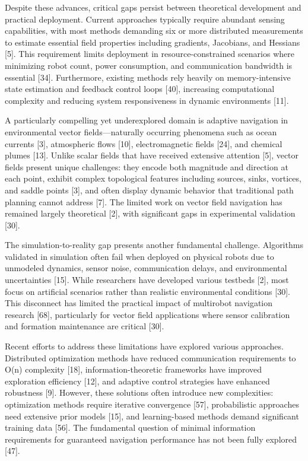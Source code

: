 \documentclass{article}
\begin{document}
Despite these advances, critical gaps persist between theoretical development and practical deployment. Current approaches typically require abundant sensing capabilities, with most methods demanding six or more distributed measurements to estimate essential field properties including gradients, Jacobians, and Hessians [5]. This requirement limits deployment in resource-constrained scenarios where minimizing robot count, power consumption, and communication bandwidth is essential [34]. Furthermore, existing methods rely heavily on memory-intensive state estimation and feedback control loops [40], increasing computational complexity and reducing system responsiveness in dynamic environments [11].

A particularly compelling yet underexplored domain is adaptive navigation in environmental vector fields---naturally occurring phenomena such as ocean currents [3], atmospheric flows [10], electromagnetic fields [24], and chemical plumes [13]. Unlike scalar fields that have received extensive attention [5], vector fields present unique challenges: they encode both magnitude and direction at each point, exhibit complex topological features including sources, sinks, vortices, and saddle points [3], and often display dynamic behavior that traditional path planning cannot address [7]. The limited work on vector field navigation has remained largely theoretical [2], with significant gaps in experimental validation [30].

The simulation-to-reality gap presents another fundamental challenge. Algorithms validated in simulation often fail when deployed on physical robots due to unmodeled dynamics, sensor noise, communication delays, and environmental uncertainties [15]. While researchers have developed various testbeds [2], most focus on artificial scenarios rather than realistic environmental conditions [30]. This disconnect has limited the practical impact of multirobot navigation research [68], particularly for vector field applications where sensor calibration and formation maintenance are critical [30].


Recent efforts to address these limitations have explored various approaches. Distributed optimization methods have reduced communication requirements to O(n) complexity [18], information-theoretic frameworks have improved exploration efficiency [12], and adaptive control strategies have enhanced robustness [9]. However, these solutions often introduce new complexities: optimization methods require iterative convergence [57], probabilistic approaches need extensive prior models [15], and learning-based methods demand significant training data [56]. The fundamental question of minimal information requirements for guaranteed navigation performance has not been fully explored [47].
\end{document}
